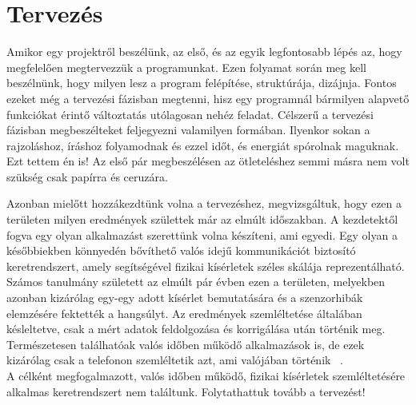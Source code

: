 \documentclass{thesis-ekf}
\theoremstyle{definition}
\theoremstyle{remark}
\begin{document}
\chapter{Tervezés}

Amikor egy projektről beszélünk, az első, és az egyik legfontosabb lépés az, hogy megfelelően megtervezzük a programunkat. Ezen folyamat során meg kell beszélnünk, hogy milyen lesz a program felépítése, struktúrája, dizájnja. Fontos ezeket még a tervezési fázisban megtenni, hisz egy programnál bármilyen alapvető funkciókat érintő változtatás utólagosan nehéz feladat. Célszerű a tervezési fázisban megbeszélteket feljegyezni valamilyen formában. Ilyenkor sokan a rajzoláshoz, íráshoz folyamodnak és ezzel időt, és energiát spórolnak maguknak. Ezt tettem én is! Az első pár megbeszélésen az ötleteléshez semmi másra nem volt szükség csak papírra és ceruzára.

\par Azonban mielőtt hozzákezdtünk volna a tervezéshez, megvizsgáltuk, hogy ezen a területen milyen eredmények születtek már az elmúlt időszakban. A kezdetektől fogva egy olyan alkalmazást szerettünk volna készíteni, ami egyedi. Egy olyan a későbbiekben könnyedén bővíthető valós idejű kommunikációt biztosító keretrendszert, amely segítségével fizikai kísérletek széles skálája reprezentálható.
Számos tanulmány született az elmúlt pár évben ezen a területen, melyekben azonban kizárólag egy-egy adott kísérlet bemutatására és a szenzorhibák elemzésére fektették a hangsúlyt. Az eredmények szemléltetése általában késleltetve, csak a mért adatok feldolgozása és korrigálása után történik meg. Természetesen találhatóak valós időben működő alkalmazások is, de ezek kizárólag csak a telefonon szemléltetik azt, ami valójában történik ~\cite{cimke1,cimke2,cimke3,cimke4,cimk5}. \\
A célként megfogalmazott, valós időben működő, fizikai kísérletek szemléltetésére alkalmas keretrendszert nem találtunk. Folytathattuk tovább a tervezést!
\end{document}
